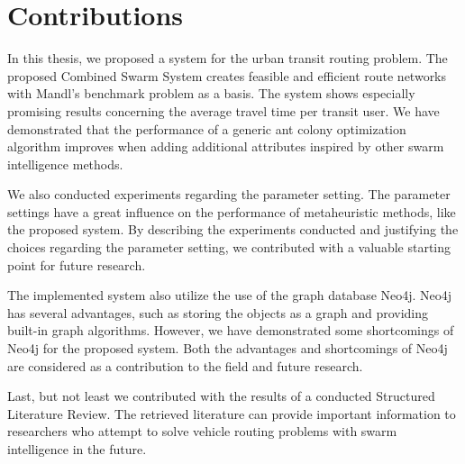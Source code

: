 \section{Contributions}


%

In this thesis, we proposed a system for the urban transit routing problem. The proposed Combined Swarm System creates feasible and efficient route networks with Mandl's benchmark problem\citep{mandl79} as a basis. The system shows especially promising results concerning the average travel time per transit user. We have demonstrated that the performance of a generic ant colony optimization algorithm improves when adding additional attributes inspired by other swarm intelligence methods. 

We also conducted experiments regarding the parameter setting. The parameter settings have a great influence on the performance of metaheuristic methods, like the proposed system. By describing the experiments conducted and justifying the choices regarding the parameter setting, we contributed with a valuable starting point for future research. 

The implemented system also utilize the use of the graph database Neo4j. Neo4j has several advantages, such as storing the objects as a graph and providing built-in graph algorithms. However, we have demonstrated some shortcomings of Neo4j for the proposed system. Both the advantages and shortcomings of Neo4j are considered as a contribution to the field and future research. 

Last, but not least we contributed with the results of a conducted Structured Literature Review. The retrieved literature can provide important information to researchers who attempt to solve vehicle routing problems with swarm intelligence in the future. 


